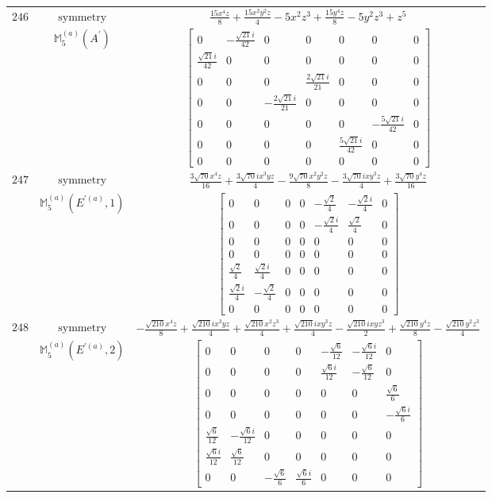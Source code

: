 \documentclass[fleqn,8pt,landscape]{jsarticle}
\begin{document}
\begin{longtable}{ccc}
$ 246 $ & $ \text{symmetry} $ & $ \frac{15 x^{4} z}{8} + \frac{15 x^{2} y^{2} z}{4} - 5 x^{2} z^{3} + \frac{15 y^{4} z}{8} - 5 y^{2} z^{3} + z^{5} $ \\
$  $ & $ \mathbb{M}_{5}^{(a)}(A^{\prime}) $ & $ \begin{bmatrix} 0 & - \frac{\sqrt{21} i}{42} & 0 & 0 & 0 & 0 & 0 \\ \frac{\sqrt{21} i}{42} & 0 & 0 & 0 & 0 & 0 & 0 \\ 0 & 0 & 0 & \frac{2 \sqrt{21} i}{21} & 0 & 0 & 0 \\ 0 & 0 & - \frac{2 \sqrt{21} i}{21} & 0 & 0 & 0 & 0 \\ 0 & 0 & 0 & 0 & 0 & - \frac{5 \sqrt{21} i}{42} & 0 \\ 0 & 0 & 0 & 0 & \frac{5 \sqrt{21} i}{42} & 0 & 0 \\ 0 & 0 & 0 & 0 & 0 & 0 & 0 \end{bmatrix} $ \\ \hline
$ 247 $ & $ \text{symmetry} $ & $ \frac{3 \sqrt{70} x^{4} z}{16} + \frac{3 \sqrt{70} i x^{3} y z}{4} - \frac{9 \sqrt{70} x^{2} y^{2} z}{8} - \frac{3 \sqrt{70} i x y^{3} z}{4} + \frac{3 \sqrt{70} y^{4} z}{16} $ \\
$  $ & $ \mathbb{M}_{5}^{(a)}(E^{\prime(a)},1) $ & $ \begin{bmatrix} 0 & 0 & 0 & 0 & - \frac{\sqrt{2}}{4} & - \frac{\sqrt{2} i}{4} & 0 \\ 0 & 0 & 0 & 0 & - \frac{\sqrt{2} i}{4} & \frac{\sqrt{2}}{4} & 0 \\ 0 & 0 & 0 & 0 & 0 & 0 & 0 \\ 0 & 0 & 0 & 0 & 0 & 0 & 0 \\ \frac{\sqrt{2}}{4} & \frac{\sqrt{2} i}{4} & 0 & 0 & 0 & 0 & 0 \\ \frac{\sqrt{2} i}{4} & - \frac{\sqrt{2}}{4} & 0 & 0 & 0 & 0 & 0 \\ 0 & 0 & 0 & 0 & 0 & 0 & 0 \end{bmatrix} $ \\ \hline
$ 248 $ & $ \text{symmetry} $ & $ - \frac{\sqrt{210} x^{4} z}{8} + \frac{\sqrt{210} i x^{3} y z}{4} + \frac{\sqrt{210} x^{2} z^{3}}{4} + \frac{\sqrt{210} i x y^{3} z}{4} - \frac{\sqrt{210} i x y z^{3}}{2} + \frac{\sqrt{210} y^{4} z}{8} - \frac{\sqrt{210} y^{2} z^{3}}{4} $ \\
$  $ & $ \mathbb{M}_{5}^{(a)}(E^{\prime(a)},2) $ & $ \begin{bmatrix} 0 & 0 & 0 & 0 & - \frac{\sqrt{6}}{12} & - \frac{\sqrt{6} i}{12} & 0 \\ 0 & 0 & 0 & 0 & \frac{\sqrt{6} i}{12} & - \frac{\sqrt{6}}{12} & 0 \\ 0 & 0 & 0 & 0 & 0 & 0 & \frac{\sqrt{6}}{6} \\ 0 & 0 & 0 & 0 & 0 & 0 & - \frac{\sqrt{6} i}{6} \\ \frac{\sqrt{6}}{12} & - \frac{\sqrt{6} i}{12} & 0 & 0 & 0 & 0 & 0 \\ \frac{\sqrt{6} i}{12} & \frac{\sqrt{6}}{12} & 0 & 0 & 0 & 0 & 0 \\ 0 & 0 & - \frac{\sqrt{6}}{6} & \frac{\sqrt{6} i}{6} & 0 & 0 & 0 \end{bmatrix} $ \\ \hline

\end{longtable}
\end{document}
